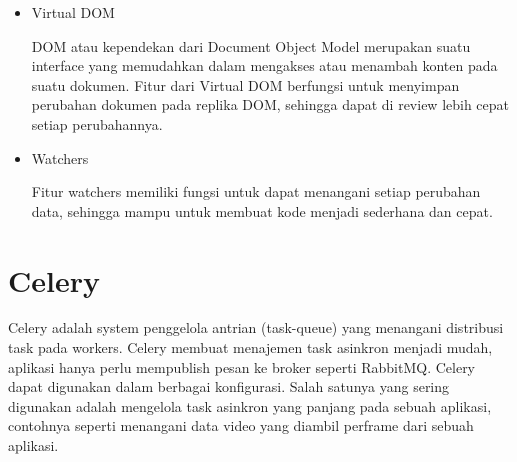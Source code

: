 \begin{itemize}
  \item Virtual DOM
  
  DOM atau kependekan dari Document Object Model merupakan suatu interface yang memudahkan dalam mengakses atau menambah konten pada suatu dokumen. Fitur dari Virtual DOM berfungsi untuk menyimpan perubahan dokumen pada replika DOM, sehingga dapat di review lebih cepat setiap perubahannya.

  \item Watchers
  
  Fitur watchers memiliki fungsi untuk dapat menangani setiap perubahan data, sehingga mampu untuk membuat kode menjadi sederhana dan cepat.



\end{itemize}

\section{Celery}

Celery adalah system penggelola antrian (task-queue) yang menangani distribusi task pada workers.
Celery membuat menajemen task asinkron menjadi mudah, aplikasi hanya perlu mempublish pesan ke broker seperti RabbitMQ.
Celery dapat digunakan dalam berbagai konfigurasi.
Salah satunya yang sering digunakan adalah mengelola task asinkron yang panjang pada sebuah aplikasi,
contohnya seperti menangani data video yang diambil perframe dari sebuah aplikasi.







